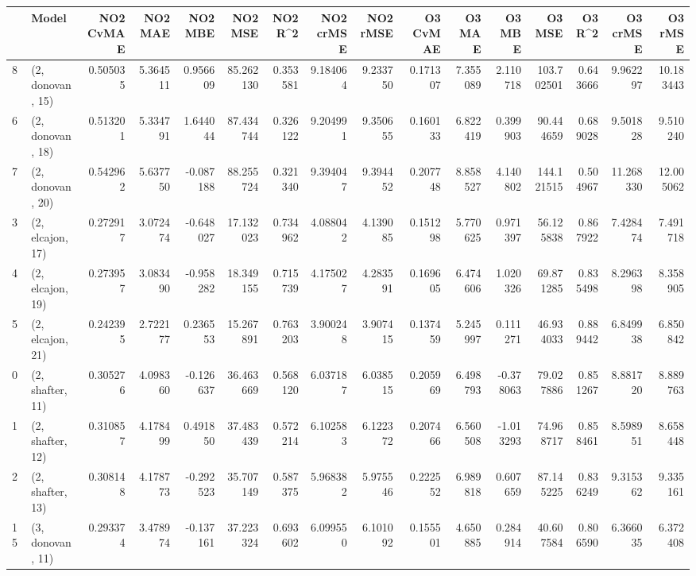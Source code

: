 \begin{tabular}{llrrrrrrrrrrrrrr}
\toprule
{} &             Model &  NO2 CvMAE &   NO2 MAE &   NO2 MBE &    NO2 MSE &   NO2 R\textasciicircum2 &  NO2 crMSE &  NO2 rMSE &  O3 CvMAE &    O3 MAE &    O3 MBE &      O3 MSE &    O3 R\textasciicircum2 &   O3 crMSE &    O3 rMSE \\
\midrule
8  &  (2, donovan, 15) &   0.505035 &  5.364511 &  0.956609 &  85.262130 &  0.353581 &   9.184064 &  9.233750 &  0.171307 &  7.355089 &  2.110718 &  103.702501 &  0.643666 &   9.962297 &  10.183443 \\
6  &  (2, donovan, 18) &   0.513201 &  5.334791 &  1.644044 &  87.434744 &  0.326122 &   9.204991 &  9.350655 &  0.160133 &  6.822419 &  0.399903 &   90.444659 &  0.689028 &   9.501828 &   9.510240 \\
7  &  (2, donovan, 20) &   0.542962 &  5.637750 & -0.087188 &  88.255724 &  0.321340 &   9.394047 &  9.394452 &  0.207748 &  8.858527 &  4.140802 &  144.121515 &  0.504967 &  11.268330 &  12.005062 \\
3  &  (2, elcajon, 17) &   0.272917 &  3.072474 & -0.648027 &  17.132023 &  0.734962 &   4.088042 &  4.139085 &  0.151298 &  5.770625 &  0.971397 &   56.125838 &  0.867922 &   7.428474 &   7.491718 \\
4  &  (2, elcajon, 19) &   0.273957 &  3.083490 & -0.958282 &  18.349155 &  0.715739 &   4.175027 &  4.283591 &  0.169605 &  6.474606 &  1.020326 &   69.871285 &  0.835498 &   8.296398 &   8.358905 \\
5  &  (2, elcajon, 21) &   0.242395 &  2.722177 &  0.236553 &  15.267891 &  0.763203 &   3.900248 &  3.907415 &  0.137459 &  5.245997 &  0.111271 &   46.934033 &  0.889442 &   6.849938 &   6.850842 \\
0  &  (2, shafter, 11) &   0.305276 &  4.098360 & -0.126637 &  36.463669 &  0.568120 &   6.037187 &  6.038515 &  0.205969 &  6.498793 & -0.378063 &   79.027886 &  0.851267 &   8.881720 &   8.889763 \\
1  &  (2, shafter, 12) &   0.310857 &  4.178499 &  0.491850 &  37.483439 &  0.572214 &   6.102583 &  6.122372 &  0.207466 &  6.560508 & -1.013293 &   74.968717 &  0.858461 &   8.598951 &   8.658448 \\
2  &  (2, shafter, 13) &   0.308148 &  4.178773 & -0.292523 &  35.707149 &  0.587375 &   5.968382 &  5.975546 &  0.222552 &  6.989818 &  0.607659 &   87.145225 &  0.836249 &   9.315362 &   9.335161 \\
15 &  (3, donovan, 11) &   0.293374 &  3.478974 & -0.137161 &  37.223324 &  0.693602 &   6.099550 &  6.101092 &  0.155501 &  4.650885 &  0.284914 &   40.607584 &  0.806590 &   6.366035 &   6.372408 \\

\end{tabular}
